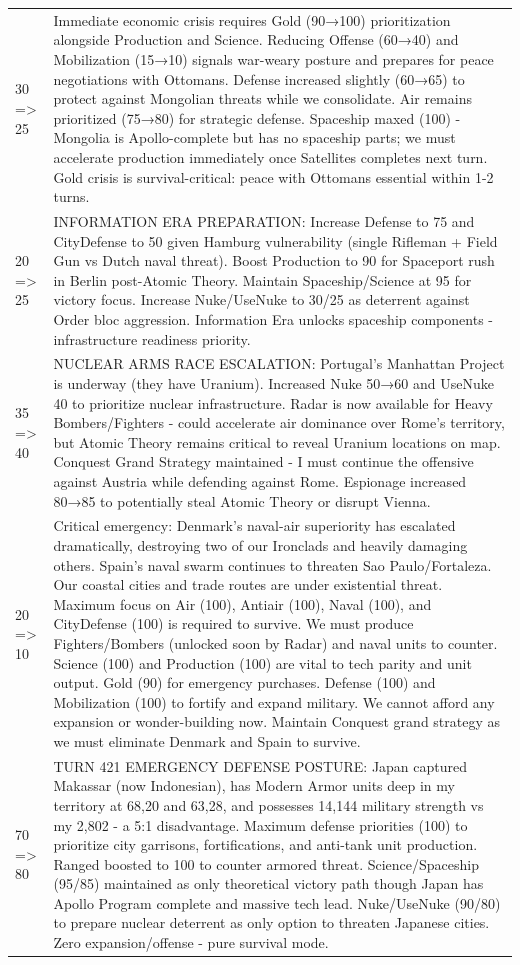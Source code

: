 \begin{longtable}{p{}p{}}
30 => 25 & Immediate economic crisis requires Gold (90→100) prioritization alongside Production and Science. Reducing Offense (60→40) and Mobilization (15→10) signals war-weary posture and prepares for peace negotiations with Ottomans. Defense increased slightly (60→65) to protect against Mongolian threats while we consolidate. Air remains prioritized (75→80) for strategic defense. Spaceship maxed (100) - Mongolia is Apollo-complete but has no spaceship parts; we must accelerate production immediately once Satellites completes next turn. Gold crisis is survival-critical: peace with Ottomans essential within 1-2 turns. \\
20 => 25 & INFORMATION ERA PREPARATION: Increase Defense to 75 and CityDefense to 50 given Hamburg vulnerability (single Rifleman + Field Gun vs Dutch naval threat). Boost Production to 90 for Spaceport rush in Berlin post-Atomic Theory. Maintain Spaceship/Science at 95 for victory focus. Increase Nuke/UseNuke to 30/25 as deterrent against Order bloc aggression. Information Era unlocks spaceship components - infrastructure readiness priority. \\
35 => 40 & NUCLEAR ARMS RACE ESCALATION: Portugal's Manhattan Project is underway (they have Uranium). Increased Nuke 50→60 and UseNuke 40 to prioritize nuclear infrastructure. Radar is now available for Heavy Bombers/Fighters - could accelerate air dominance over Rome's territory, but Atomic Theory remains critical to reveal Uranium locations on map. Conquest Grand Strategy maintained - I must continue the offensive against Austria while defending against Rome. Espionage increased 80→85 to potentially steal Atomic Theory or disrupt Vienna. \\
20 => 10 & Critical emergency: Denmark's naval-air superiority has escalated dramatically, destroying two of our Ironclads and heavily damaging others. Spain's naval swarm continues to threaten Sao Paulo/Fortaleza. Our coastal cities and trade routes are under existential threat. Maximum focus on Air (100), Antiair (100), Naval (100), and CityDefense (100) is required to survive. We must produce Fighters/Bombers (unlocked soon by Radar) and naval units to counter. Science (100) and Production (100) are vital to tech parity and unit output. Gold (90) for emergency purchases. Defense (100) and Mobilization (100) to fortify and expand military. We cannot afford any expansion or wonder-building now. Maintain Conquest grand strategy as we must eliminate Denmark and Spain to survive. \\
70 => 80 & TURN 421 EMERGENCY DEFENSE POSTURE: Japan captured Makassar (now Indonesian), has Modern Armor units deep in my territory at 68,20 and 63,28, and possesses 14,144 military strength vs my 2,802 - a 5:1 disadvantage. Maximum defense priorities (100) to prioritize city garrisons, fortifications, and anti-tank unit production. Ranged boosted to 100 to counter armored threat. Science/Spaceship (95/85) maintained as only theoretical victory path though Japan has Apollo Program complete and massive tech lead. Nuke/UseNuke (90/80) to prepare nuclear deterrent as only option to threaten Japanese cities. Zero expansion/offense - pure survival mode. \\

\end{longtable}

